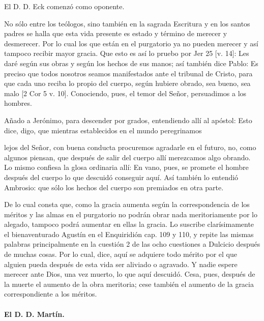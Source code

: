 El D. D. Eck comenzó como oponente.

No sólo entre los teólogos, sino también en la sagrada Escritura y en los santos padres se halla que esta vida presente es estado y término de merecer y desmerecer. Por lo cual los que están en el purgatorio ya no pueden merecer y así tampoco recibir mayor gracia. Que esto es así lo pruebo por Jer 25 [v. 14]: Les daré según sus obras y según los hechos de sus manos; así también dice Pablo: Es preciso que todos nosotros seamos manifestados ante el tribunal de Cristo, para que cada uno reciba lo propio del cuerpo, según hubiere obrado, sea bueno, sea malo [2 Cor 5 v. 10]. Conociendo, pues, el temor del Señor, persuadimos a los hombres.

Añado a Jerónimo, para descender por grados, entendiendo allí al apóstol: Esto dice, digo, que mientras establecidos en el mundo peregrinamos

lejos del Señor, con buena conducta procuremos agradarle en el futuro, no, como algunos piensan, que después de salir del cuerpo allí merezcamos algo obrando. Lo mismo confiesa la glosa ordinaria allí: En vano, pues, se promete el hombre después del cuerpo lo que descuidó conseguir aquí. Así también lo entendió Ambrosio: que sólo los hechos del cuerpo son premiados en otra parte.

De lo cual consta que, como la gracia aumenta según la correspondencia de los méritos y las almas en el purgatorio no podrán obrar nada meritoriamente por lo alegado, tampoco \marginpar{\small[323]} podrá aumentar en ellas la gracia. Lo suscribe clarísimamente el bienaventurado Agustín en el Enquiridión cap. 109 y 110, y repite las mismas palabras principalmente en la cuestión 2 de las ocho cuestiones a Dulcicio después de muchas cosas. Por lo cual, dice, aquí se adquiere todo mérito por el que alguien pueda después de esta vida ser aliviado o agravado. Y nadie espere merecer ante Dios, una vez muerto, lo que aquí descuidó. Cesa, pues, después de la muerte el aumento de la obra meritoria; cese también el aumento de la gracia correspondiente a los méritos.

\paragraph*{El D. D. Martín.}

